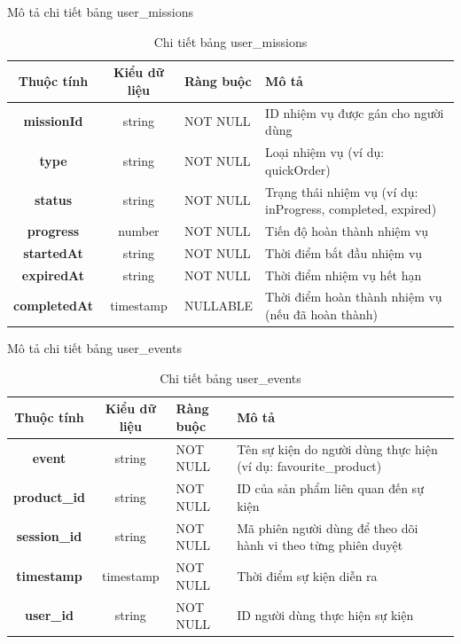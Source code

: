 \documentclass[../DoAn.tex]{subfiles}
\begin{document}
Mô tả chi tiết bảng user\_missions
\begin{table}[H]
\centering
\begin{tabular}{|c|c|l|p{7cm}|}
\hline
\textbf{Thuộc tính} & \textbf{Kiểu dữ liệu} & \textbf{Ràng buộc} & \textbf{Mô tả} \\ \hline
\textbf{missionId} & string & NOT NULL & ID nhiệm vụ được gán cho người dùng \\ \hline
\textbf{type} & string & NOT NULL & Loại nhiệm vụ (ví dụ: quickOrder) \\ \hline
\textbf{status} & string & NOT NULL & Trạng thái nhiệm vụ (ví dụ: inProgress, completed, expired) \\ \hline
\textbf{progress} & number & NOT NULL & Tiến độ hoàn thành nhiệm vụ \\ \hline
\textbf{startedAt} & string & NOT NULL & Thời điểm bắt đầu nhiệm vụ  \\ \hline
\textbf{expiredAt} & string & NOT NULL & Thời điểm nhiệm vụ hết hạn  \\ \hline
\textbf{completedAt} & timestamp & NULLABLE & Thời điểm hoàn thành nhiệm vụ (nếu đã hoàn thành) \\ \hline
\end{tabular}
\caption{Chi tiết bảng user\_missions}
\label{tab:userMissionsTable}
\end{table}

Mô tả chi tiết bảng user\_events
\begin{table}[H]
\centering
\begin{tabular}{|c|c|l|p{7cm}|}
\hline
\textbf{Thuộc tính} & \textbf{Kiểu dữ liệu} & \textbf{Ràng buộc} & \textbf{Mô tả} \\ \hline
\textbf{event} & string & NOT NULL & Tên sự kiện do người dùng thực hiện (ví dụ: favourite\_product) \\ \hline
\textbf{product\_id} & string & NOT NULL & ID của sản phẩm liên quan đến sự kiện \\ \hline
\textbf{session\_id} & string & NOT NULL & Mã phiên người dùng để theo dõi hành vi theo từng phiên duyệt \\ \hline
\textbf{timestamp} & timestamp & NOT NULL & Thời điểm sự kiện diễn ra \\ \hline
\textbf{user\_id} & string & NOT NULL & ID người dùng thực hiện sự kiện \\ \hline
\end{tabular}
\caption{Chi tiết bảng user\_events}
\label{tab:userEventsTable}
\end{table}
\end{document}
